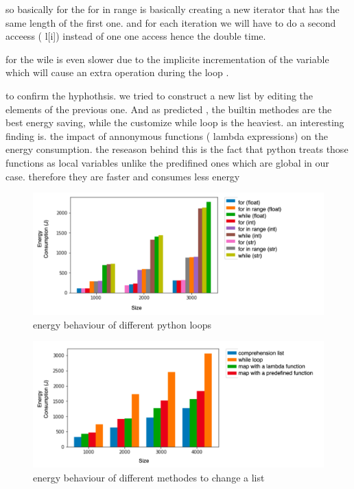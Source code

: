 so basically for the for in range is basically creating a new iterator that has the same length of the first one. and for each iteration we will have to do a second acceess ( l[i]) instead of one one access hence the double time.

for the wile is even slower due to the implicite incrementation of the variable which will cause an extra operation during the loop .

to confirm the hyphothsis. we tried to construct a new list by editing the elements of the previous one. And as predicted , the builtin methodes are the best energy saving, while the customize while loop is the heaviest. an interesting finding is. the impact of annonymous functions ( lambda expressions) on the energy consumption.
the reseason behind this is the fact that python treats those functions as local variables unlike the predifined ones which are global in our case. therefore they are faster and consumes less energy  %

\begin{figure}[htb]
    \centering
    \includegraphics[width=\linewidth]{imgs/python_iterations}
    \caption{energy behaviour of different python loops }
    \label{fig:pythonloops}
\end{figure}


\begin{figure}[htb]
    \centering
    \includegraphics[width=\linewidth]{imgs/python_treatemens}
    \caption{energy behaviour of different methodes to change a list}
    \label{fig:pythontreatement}
\end{figure}

